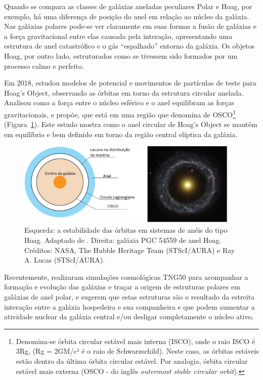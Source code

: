 Quando se compara as classes de galáxias aneladas peculiares Polar e Hoag, por exemplo, há uma diferença de posição do anel em relação ao núcleo da galáxia. Nas galáxias polares pode-se ver claramente em suas formas a fusão de galáxias e a força gravitacional entre elas causada pela interação, apresentando uma estrutura de anel catastrófico e o gás ``espalhado'' entorno da galáxia. Os objetos Hoag, por outro lado, estruturados como se tivessem sido formados por um processo calmo e perfeito.

Em 2018,  estudou modelos de potencial e movimentos de partículas de teste para Hoag's Object, observando as órbitas em torno da estrutura circular anelada. Analisou como a força entre o núcleo esférico e o anel equilibram as forças gravitacionais, e propõe, que está em uma região que denomina de OSCO\footnote{Denomina-se órbita circular estável mais interna (ISCO), onde o raio ISCO é 3Rg, (Rg = 2GM/c² é o raio de Schwarzschild). Neste caso, as órbitas estáveis estão dentro da última órbita circular estável. Por analogia, órbita circular estável mais externa (OSCO - do inglês \emph{outermost stable circular orbit}).} (Figura~\ref{fig:osco}). Este estudo mostra como o anel circular de Hoag's Object se mantém em equilíbrio e bem definido em torno da região central elíptica da galáxia.

\begin{figure}[h]
  \centering 
  \includegraphics[width=0.95\textwidth]{Imagens/innerring.PNG} 
  \caption[Estabilidade das órbitas em sistemas de anéis do tipo Hoag.]{Esquerda: a estabilidade das órbitas em sistemas de anéis do tipo Hoag. Adaptado de . Direita: galáxia PGC 54559 de anel Hoag. Créditos: NASA, The Hubble Heritage Team (STScI/AURA) e Ray A. Lucas (STScI/AURA).}
  \label{fig:osco} 
\end{figure}

Recentemente,  realizaram simulações cosmológicas TNG50 para acompanhar a formação e evolução das galáxias e traçar a origem de estruturas polares em galáxias de anel polar, e sugerem que estas estruturas são o resultado da estreita interação entre a galáxia hospedeira e sua companheira e que podem aumentar a atividade nuclear da galáxia central e/ou desligar completamente o núcleo ativo.

